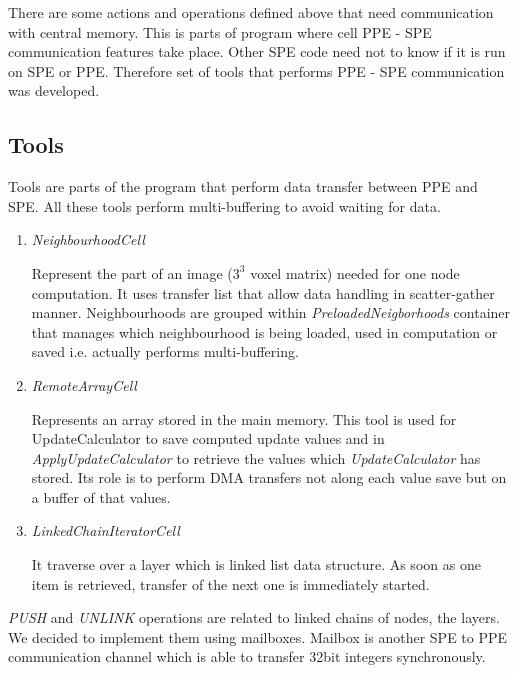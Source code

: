 
\par
There are some actions and operations defined above that need communication with central memory.
This is parts of program where cell PPE - SPE communication features take place.
Other SPE code need not to know if it is run on SPE or PPE.
Therefore set of tools that performs PPE - SPE communication was developed.

\subsection{Tools}
Tools are parts of the program that perform data transfer between PPE and SPE.
All these tools perform multi-buffering to avoid waiting for data.

\begin{enumerate}
\item \emph{NeighbourhoodCell}
\par
Represent the part of an image ($3^3$ voxel matrix) needed for one node computation.
It uses transfer list that allow data handling in scatter-gather manner.
Neighbourhoods are grouped within \mbox{\emph{PreloadedNeigborhoods}} container that manages which neighbourhood is being loaded, used in computation or saved i.e. actually performs multi-buffering.

\item \emph{RemoteArrayCell}
\par
Represents an array stored in the main memory.
This tool is used for UpdateCalculator to save computed update values and in \mbox{\emph{ApplyUpdateCalculator}} to retrieve the values which \mbox{\emph{UpdateCalculator}} has stored.
Its role is to perform DMA transfers not along each value save but on a buffer of that values.

\item \emph{LinkedChainIteratorCell}
\par
It traverse over a layer which is linked list data structure.
As soon as one item is retrieved, transfer of the next one is immediately started.
\end{enumerate}

\par
\emph{PUSH} and \emph{UNLINK} operations are related to linked chains of nodes, the layers.
We decided to implement them using mailboxes.
Mailbox is another SPE to PPE communication channel which is able to transfer 32bit integers synchronously.

